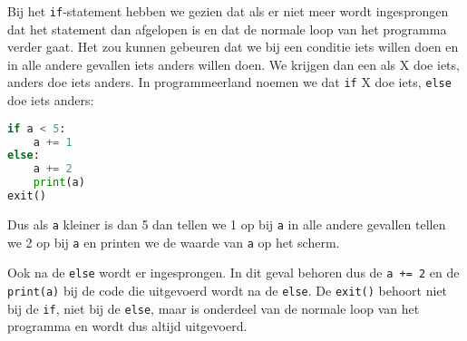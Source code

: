 Bij het \texttt{if}-statement hebben we gezien dat als er niet meer wordt ingesprongen dat het statement dan afgelopen is en dat de normale loop van het programma verder gaat. Het zou kunnen gebeuren dat we bij een conditie iets willen doen en in alle andere gevallen iets anders willen doen. We krijgen dan een als X doe iets, anders doe iets anders. In programmeerland noemen we dat \texttt{if} X doe iets, \texttt{else} doe iets anders:
\begin{lstlisting}[language=python]
if a < 5:
    a += 1
else:
    a += 2
    print(a)
exit()
\end{lstlisting}
Dus als \texttt{a} kleiner is dan 5 dan tellen we 1 op bij \texttt{a} in alle andere gevallen tellen we 2 op bij \texttt{a} en printen we de waarde van \texttt{a} op het scherm.

Ook na de \texttt{else} wordt er ingesprongen. In dit geval behoren dus de \texttt{a += 2} en de \texttt{print(a)} bij de code die uitgevoerd wordt na de \texttt{else}. De \texttt{exit()} behoort niet bij de \texttt{if}, niet bij de \texttt{else}, maar is onderdeel van de normale loop van het programma en wordt dus altijd uitgevoerd.

